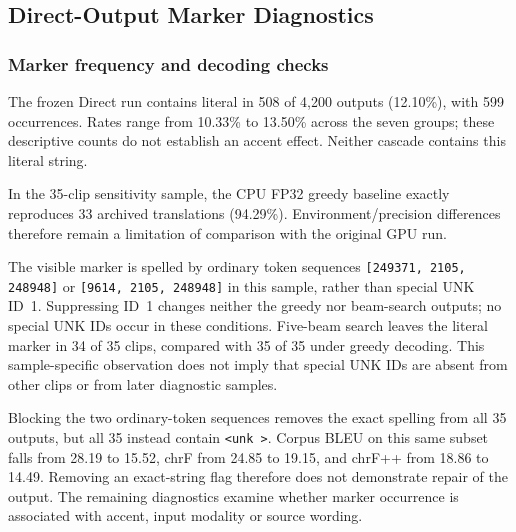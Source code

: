 \subsection{Direct-Output Marker Diagnostics}
\label{sec:earlier-diagnostic-results}

\subsubsection{Marker frequency and decoding checks}
The frozen Direct run contains literal \unk{} in 508 of 4,200 outputs
(12.10\%), with 599 occurrences. Rates range from 10.33\% to 13.50\% across
the seven groups; these descriptive counts do not establish an accent effect.
Neither cascade contains this literal string.

In the 35-clip sensitivity
sample, the CPU FP32 greedy baseline exactly reproduces 33 archived
translations (94.29\%). Environment/precision differences therefore remain a
limitation of comparison with the original GPU run.

The visible marker is spelled by ordinary token sequences
\texttt{[249371, 2105, 248948]} or \texttt{[9614, 2105, 248948]} in this sample,
rather than special UNK ID~1. Suppressing ID~1 changes neither the greedy nor
beam-search outputs; no special UNK IDs occur in these conditions. Five-beam
search leaves the literal marker in 34 of 35 clips, compared with 35 of 35 under
greedy decoding. This sample-specific observation does not imply that special
UNK IDs are absent from other clips or from later diagnostic samples.

Blocking the two ordinary-token sequences removes the exact spelling from all
35 outputs, but all 35 instead contain \mbox{\texttt{<unk >}}. Corpus BLEU on this
same subset falls from 28.19 to 15.52, chrF from 24.85 to 19.15, and chrF++ from
18.86 to 14.49. Removing an exact-string flag therefore does not demonstrate
repair of the output. The remaining diagnostics examine whether marker
occurrence is associated with accent, input modality or source wording.
